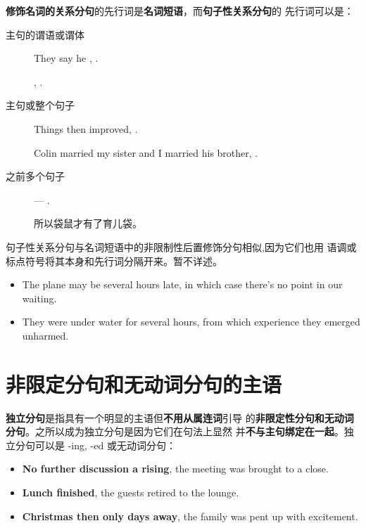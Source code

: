 \textbf{修饰名词的关系分句}的先行词是\textbf{名词短语}，而\textbf{句子性关系分句}的
先行词可以是：
\begin{description}
\item[主句的谓语或谓体] They say he , .

  , .

\item[主句或整个句子] Things then improved, .

  Colin married my sister and I married his brother, .

\item[之前多个句子] --- .

  所以袋鼠才有了育儿袋。

\end{description}

句子性关系分句与名词短语中的非限制性后置修饰分句相似,因为它们也用
语调或标点符号将其本身和先行词分隔开来。暂不详述。
\begin{itemize}
\item The plane may be several hours late, in which case there's no point in our waiting.

\item They were under water for several hours, from which experience they
  emerged unharmed.
\end{itemize}


\section{非限定分句和无动词分句的主语}

\textbf{独立分句}是指具有一个明显的主语但\textbf{不用从属连词}引导
的\textbf{非限定性分句和无动词分句}。之所以成为独立分句是因为它们在句法上显然
并\textbf{不与主句绑定在一起}。独立分句可以是 -ing, -ed 或无动词分句：
\begin{itemize}
\item \textbf{No further discussion a rising}, the meeting was brought to a close.
\item \textbf{Lunch finished}, the guests retired to the lounge.
\item \textbf{Christmas then only days away}, the family was pent up with excitement.
\end{itemize}

